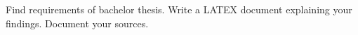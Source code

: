 \begin{displayquote}
Find requirements of bachelor thesis. Write a LATEX document explaining your
findings. Document your sources.
\end{displayquote}